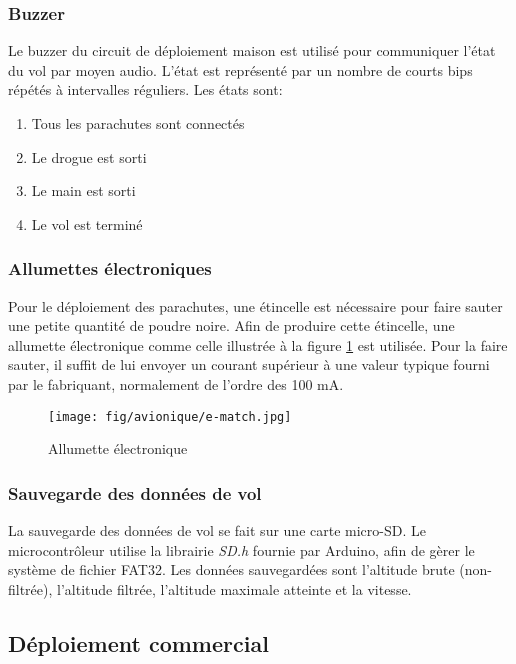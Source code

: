 \subsubsection{Buzzer}

Le buzzer du circuit de déploiement maison est utilisé pour communiquer l'état
du vol par moyen audio. L'état est représenté par un nombre de courts bips
répétés à intervalles réguliers. Les états sont:

\begin{enumerate}
	\item Tous les parachutes sont connectés
	\item Le drogue est sorti
	\item Le main est sorti
	\item Le vol est terminé
\end{enumerate}


\subsubsection{Allumettes électroniques}

Pour le déploiement des parachutes, une étincelle est nécessaire pour faire
sauter une petite quantité de poudre noire. Afin de produire cette étincelle,
une allumette électronique comme celle illustrée à la figure \ref{f:e-match} est
utilisée. Pour la faire sauter, il suffit de lui envoyer un courant supérieur
à une valeur typique fourni par le fabriquant, normalement de l'ordre des
100 mA.

\begin{figure}[H]
	\center
	\texttt{[image: fig/avionique/e-match.jpg]}
	\caption{Allumette électronique}
	\label{f:e-match}
\end{figure}

\subsubsection{Sauvegarde des données de vol}

La sauvegarde des données de vol se fait sur une carte micro-SD. Le
microcontrôleur utilise la librairie \textit{SD.h} fournie par Arduino, afin
de gèrer le système de fichier FAT32. Les données sauvegardées sont l'altitude
brute (non-filtrée), l'altitude filtrée, l'altitude maximale atteinte et la
vitesse.

\subsection{Déploiement commercial}

